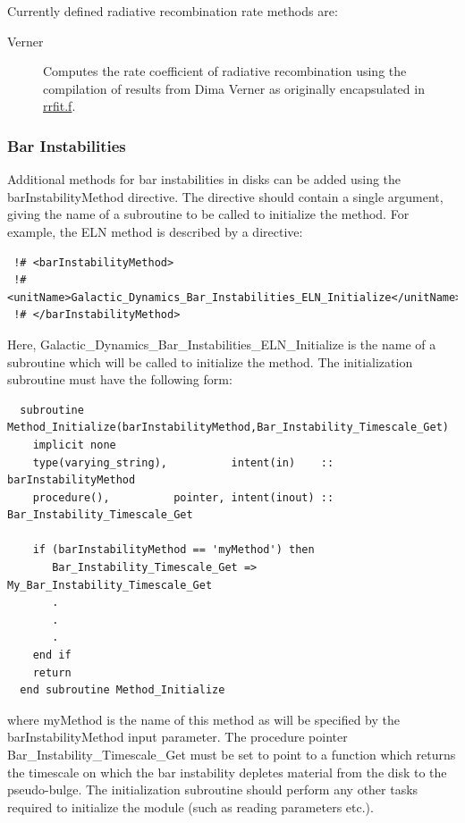 Currently defined radiative recombination rate methods are:
\begin{description}
 \item [{\normalfont \ttfamily Verner}]  Computes the rate coefficient of radiative recombination using the compilation of results from Dima Verner as originally encapsulated in \href{ftp://gradj.pa.uky.edu//dima//rec//rrfit.f}{{\normalfont \ttfamily rrfit.f}}.
\end{description}

\subsubsection{Bar Instabilities}

Additional methods for bar instabilities in disks can be added using the {\normalfont \ttfamily barInstabilityMethod} directive. The directive should contain a single argument, giving the name of a subroutine to be called to initialize the method. For example, the {\normalfont \ttfamily ELN} method is described by a directive:
\begin{verbatim}
 !# <barInstabilityMethod>
 !#  <unitName>Galactic_Dynamics_Bar_Instabilities_ELN_Initialize</unitName>
 !# </barInstabilityMethod>
\end{verbatim}
Here, {\normalfont \ttfamily Galactic\_Dynamics\_Bar\_Instabilities\_ELN\_Initialize} is the name of a subroutine which will be called to initialize the method. The initialization subroutine must have the following form:
\begin{verbatim}
  subroutine Method_Initialize(barInstabilityMethod,Bar_Instability_Timescale_Get)
    implicit none
    type(varying_string),          intent(in)    :: barInstabilityMethod
    procedure(),          pointer, intent(inout) :: Bar_Instability_Timescale_Get
    
    if (barInstabilityMethod == 'myMethod') then
       Bar_Instability_Timescale_Get => My_Bar_Instability_Timescale_Get
       .
       .
       .
    end if
    return
  end subroutine Method_Initialize
\end{verbatim}
where {\normalfont \ttfamily myMethod} is the name of this method as will be specified by the {\normalfont \ttfamily barInstabilityMethod} input parameter. The procedure pointer {\normalfont \ttfamily Bar\_Instability\_Timescale\_Get} must be set to point to a function which returns the timescale on which the bar instability depletes material from the disk to the pseudo-bulge. The initialization subroutine should perform any other tasks required to initialize the module (such as reading parameters etc.).

